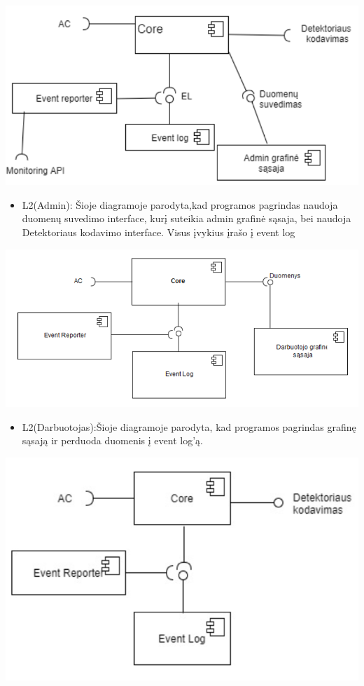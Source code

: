 \documentclass[oneside]{VUMIFPSkursinis}
\begin{document}
	\includegraphics[width=\textwidth,height=\textheight,keepaspectratio]{l2admin.png}
	
	\begin{itemize}
		\item L2(Admin): Šioje diagramoje parodyta,kad programos pagrindas naudoja duomenų suvedimo interface, kurį suteikia admin grafinė sąsaja, bei naudoja Detektoriaus kodavimo interface. Visus įvykius įrašo į event log

	\end{itemize}

		\includegraphics[width=\textwidth,height=\textheight,keepaspectratio]{l2darb.png}

\begin{itemize}
		\item L2(Darbuotojas):Šioje diagramoje parodyta, kad programos pagrindas  grafinę sąsają ir perduoda duomenis į event log’ą. 

	\end{itemize}

		\includegraphics[width=\textwidth,height=\textheight,keepaspectratio]{l2det.png}
\end{document}
